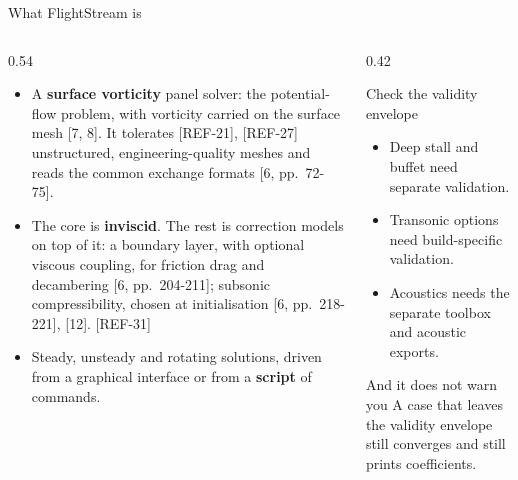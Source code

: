 \begin{frame}{What FlightStream is}
\begin{columns}[T]
\begin{column}{0.54\textwidth}
\begin{itemize}\small
  \item A \textbf{surface vorticity} panel solver: the potential-flow problem,
        with vorticity carried on the surface mesh [7, 8]. It tolerates [REF-21], [REF-27]
        unstructured, engineering-quality meshes and reads the common exchange
        formats [6, pp.~72-75].
  \item The core is \textbf{inviscid}. The rest is correction models on top of
        it: a boundary layer, with optional viscous coupling, for friction drag
        and decambering [6, pp.~204-211]; subsonic compressibility, chosen at
        initialisation [6, pp.~218-221], [12]. [REF-31]
  \item Steady, unsteady and rotating solutions, driven from a graphical
        interface or from a \textbf{script} of commands.
\end{itemize}
\end{column}
\begin{column}{0.42\textwidth}
\begin{alertblock}{Check the validity envelope}
\begin{itemize}\small
  \item Deep stall and buffet need separate validation.
  \item Transonic options need build-specific validation.
  \item Acoustics needs the separate toolbox and acoustic exports.
\end{itemize}
\end{alertblock}
\begin{alertblock}{And it does not warn you}
\small A case that leaves the validity envelope still converges and still
prints coefficients.
\end{alertblock}
\end{column}
\end{columns}
\end{frame}


